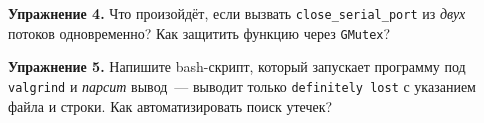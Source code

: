\begin{exercisebox}
\textbf{Упражнение 4.} Что произойдёт, если вызвать
\texttt{close\_serial\_port} из \emph{двух} потоков
одновременно? Как защитить функцию через \texttt{GMutex}?
\end{exercisebox}

\begin{exercisebox}
\textbf{Упражнение 5.} Напишите bash-скрипт, который
запускает программу под \texttt{valgrind} и \emph{парсит}
вывод~--- выводит только \texttt{definitely lost} с указанием
файла и строки. Как автоматизировать поиск утечек?
\end{exercisebox}



